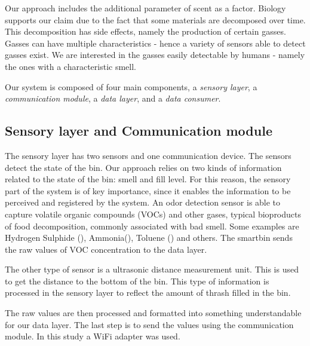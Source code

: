 Our approach includes the additional parameter of scent as a factor.
Biology supports our claim due to the fact that some materials are decomposed over time.
This decomposition has side effects, namely the production of certain gasses.
Gasses can have multiple characteristics - hence a variety of sensors able to detect gasses exist.
We are interested in the gasses easily detectable by humans - namely the ones with a characteristic smell.

Our system is composed of four main components, a \textit{sensory layer}, a \textit{communication module},  a \textit{	data layer}, and a \textit{data consumer}. 

\subsection{Sensory layer and Communication module}
The sensory layer has two sensors and one communication device. The sensors detect the state of the bin.
Our approach relies on two kinds of information related to the state of the bin: smell and fill level.
For this reason, the sensory part of the system is of key importance, since it enables the information to be perceived and registered by the system.
An odor detection sensor is able to capture volatile organic compounds (VOCs) and other gases, typical bioproducts of food decomposition, commonly associated with bad smell. 
Some examples are Hydrogen Sulphide (), Ammonia(), Toluene () and others.
The smartbin sends the raw values of VOC concentration to the data layer.

The other type of sensor is a ultrasonic distance measurement unit. This is used to get the distance to the bottom of the bin.
This type of information is processed in the sensory layer to reflect the amount of thrash filled in the bin.

The raw values are then processed and formatted into something understandable for our data layer.
The last step is to send the values using the communication module. In this study a WiFi adapter was used.

